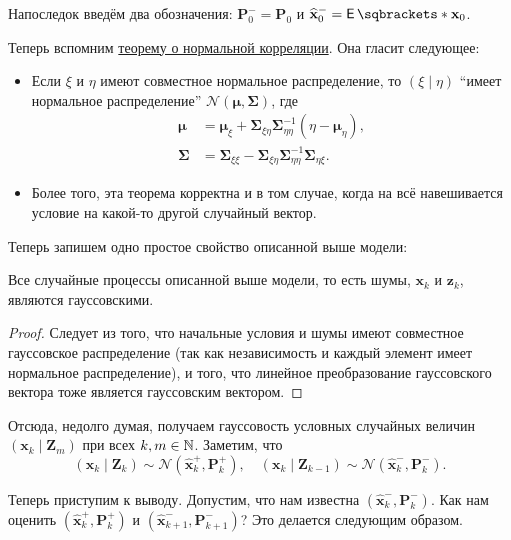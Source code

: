 Напоследок введём два обозначения: \(\mathbf{P}_{0}^{-} = \mathbf{P}_{0}\) и 
\(\hat{\mathbf{x}}_{0}^{-} = \E{\mathbf{x}_{0}}\).

Теперь вспомним \hyperref[normal-correlation-theorem]{теорему о нормальной 
корреляции}. Она гласит следующее:
\begin{itemize}
	\item Если \(\xi\) и \(\eta\) имеют совместное нормальное распределение, то 
	\((\xi \mid \eta)\) ``имеет нормальное распределение'' 
	\(\mathcal{N}(\bm{\mu}, \bm{\Sigma})\), где
	\begin{align*}
		\bm{\mu} &= \bm{\mu}_{\xi} + \bm{\Sigma}_{\xi\eta} 
		\bm{\Sigma}_{\eta\eta}^{-1}(\eta - \bm{\mu}_{\eta}),\\
		\bm{\Sigma} &= \bm{\Sigma}_{\xi\xi} - \bm{\Sigma}_{\xi\eta} 
		\bm{\Sigma}_{\eta\eta}^{-1}\bm{\Sigma}_{\eta\xi}.
	\end{align*}
	
	\item Более того, эта теорема корректна и в том случае, когда на всё 
	навешивается условие на какой-то другой случайный вектор.
\end{itemize}

Теперь запишем одно простое свойство описанной выше модели:
\begin{property}
	Все случайные процессы описанной выше модели, то есть шумы, 
	\(\mathbf{x}_{k}\) и \(\mathbf{z}_{k}\), являются гауссовскими.
\end{property}
\begin{proof}
	Следует из того, что начальные условия и шумы имеют совместное гауссовское 
	распределение (так как независимость и каждый элемент имеет нормальное 
	распределение), и того, что линейное преобразование гауссовского вектора 
	тоже является гауссовским вектором.
\end{proof}

Отсюда, недолго думая, получаем гауссовость условных случайных величин 
\((\mathbf{x}_{k} \mid \mathbf{Z}_{m})\) при всех \(k, m \in \mathbb{N}\). Заметим, что
\[
	(\mathbf{x}_{k} \mid \mathbf{Z}_{k}) \sim \mathcal{N} 
	(\hat{\mathbf{x}}_{k}^{+}, \mathbf{P}_{k}^{+}), \quad
	(\mathbf{x}_{k} \mid \mathbf{Z}_{k - 1}) \sim \mathcal{N} 
	(\hat{\mathbf{x}}_{k}^{-}, \mathbf{P}_{k}^{-}).
\]

Теперь приступим к выводу. Допустим, что нам известна 
\((\hat{\mathbf{x}}_{k}^{-}, \mathbf{P}_{k}^{-})\). Как нам оценить 
\((\hat{\mathbf{x}}_{k}^{+}, \mathbf{P}_{k}^{+})\) и \((\hat{\mathbf{x}}_{k + 
1}^{-}, \mathbf{P}_{k + 1}^{-})\)? Это делается следующим образом.

